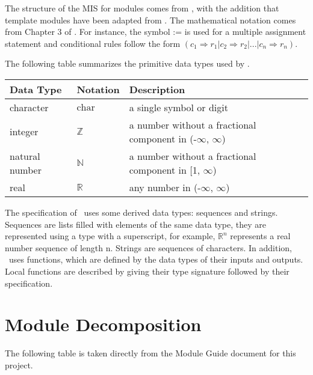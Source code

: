 \documentclass[12pt, titlepage]{article}
\begin{document}
The structure of the MIS for modules comes from \citet{HoffmanAndStrooper1995},
with the addition that template modules have been adapted from
\cite{GhezziEtAl2003}.  The mathematical notation comes from Chapter 3 of
\citet{HoffmanAndStrooper1995}.  For instance, the symbol := is used for a
multiple assignment statement and conditional rules follow the form $(c_1
\Rightarrow r_1 | c_2 \Rightarrow r_2 | ... | c_n \Rightarrow r_n )$.

The following table summarizes the primitive data types used by \progname. 

\begin{center}
\renewcommand{\arraystretch}{1.2}
\noindent 
\begin{tabular}{l l p{7.5cm}} 
\toprule 
\textbf{Data Type} & \textbf{Notation} & \textbf{Description}\\ 
\midrule
character & $\text{char}$ & a single symbol or digit\\
integer & $\mathbb{Z}$ & a number without a fractional component in (-$\infty$,
$\infty$) \\
natural number & $\mathbb{N}$ & a number without a fractional component in [1,
$\infty$) \\
real & $\mathbb{R}$ & any number in (-$\infty$, $\infty$)\\
\bottomrule
\end{tabular}
\end{center}

\noindent
The specification of \progname \ uses some derived data types: sequences and
strings. Sequences are lists filled with elements of the same data type, they
are represented using a type with a superscript, for example, $\mathbb{R}^n$
represents a real number sequence of length n. Strings are sequences of
characters. In addition, \progname \ uses functions, which are defined by the
data types of their inputs and outputs. Local functions are described by giving
their type signature followed by their specification.

\section{Module Decomposition}

The following table is taken directly from the Module Guide document for this
project.
\end{document}
